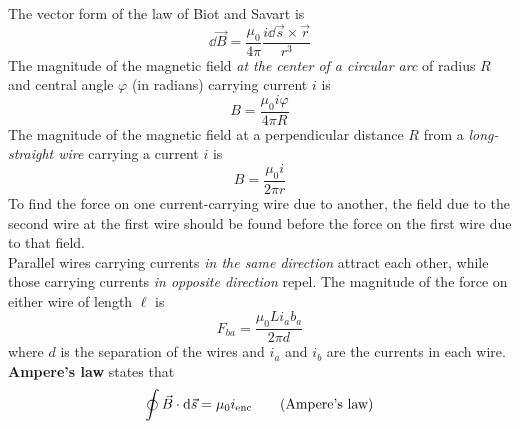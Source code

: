 \documentclass{subfiles}
\begin{document}
		The vector form of the law of Biot and Savart is
		\[\dd{\vec{B}} = \frac{\mu_0}{4\pi}\frac{i\dd{\vec{s}} \times \vec{r}}{r^3} \tag{law of Biot and Savart}\]
	The magnitude of the magnetic field \textit{at the center of a circular arc} of radius \(R\) and central angle \(\varphi\) (in radians) carrying current \(i\) is
		\[B = \frac{\mu_0i\varphi}{4\pi R}\]
	The magnitude of the magnetic field at a perpendicular distance \(R\) from a \textit{long-straight wire} carrying a current \(i\) is
		\[B = \frac{\mu_0 i}{2\pi r}\]
	To find the force on one current-carrying wire due to another, the field due to the second wire at the first wire should be found before the force on the first wire due to that field. \\
	Parallel wires carrying currents \textit{in the same direction} attract each other, while those carrying currents \textit{in opposite direction} repel. The magnitude of the force on either wire of length \(\ell\) is
		\[
			F_{ba} = \frac{\mu_0 Li_ab_a}{2\pi d}
		\]
		where \(d\) is the separation of the wires and \(i_a\) and \(i_b\) are the currents in each wire.
	\textbf{Ampere's law} states that
		\[
			\oint \vec{B} \cdot \dd{\vec{s}}
				= \mu_0i_{\text{enc}}
				\tag{Ampere's law}
		\]
		
\end{document}
